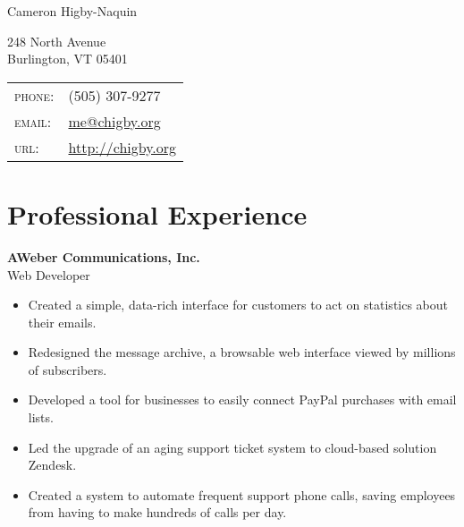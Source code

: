 \documentclass[10pt, a4paper]{article}
\newcommand{\years}[1]{\marginnote{\scriptsize #1}}
\begin{document}
{\LARGE Cameron Higby-Naquin}\\
\begin{multicols}{2}
248 North Avenue\\
Burlington, VT 05401
\vfill
\columnbreak
\begin{tabular}{ll}
\textsc{phone}:&(505) 307-9277\\ %
\textsc{email}:&\href{mailto:me@chigby.org}{me@chigby.org}\\
\textsc{url}:&\href{http://chigby.org/}{http://chigby.org}\\
\end{tabular}
\end{multicols}

\section*{Professional Experience}
\noindent
\years{2009-2012}\textbf{AWeber Communications, Inc.}\\
Web Developer
\begin{itemize}
\item Created a simple, data-rich interface for customers to act on statistics about their emails.
\item Redesigned the message archive, a browsable web interface viewed by millions of subscribers.
\item Developed a tool for businesses to easily connect PayPal purchases with email lists. %
\item Led the upgrade of an aging support ticket system to cloud-based solution Zendesk.
\item Created a system to automate frequent support phone calls, saving employees from having to make hundreds of calls per day.
\end{itemize}
\end{document}
